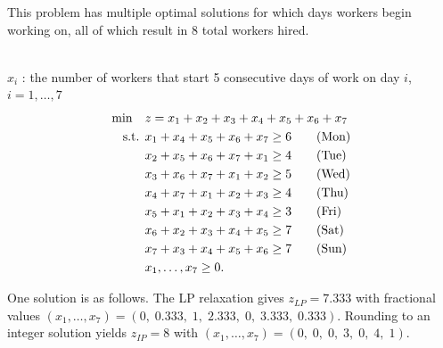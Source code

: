 \begin{solution} This problem has multiple optimal solutions for which days workers begin working on, all of which result in 8 total workers hired.

 \\
$x_i$ : the number of workers that start 5 consecutive days of work on day $i$, $ i = 1,\dots,7$ \\
\smallskip {}
\begin{align*}
\min \quad & z = x_1 + x_2 + x_3 + x_4 + x_5 + x_6 + x_7 \\
\mbox{ s.t. }        & x_1 + x_4 + x_5 + x_6 + x_7 \ge 6   \tag{Mon} \\
& x_2 + x_5 + x_6 + x_7 + x_1 \ge 4   \tag{Tue} \\
& x_3 + x_6 + x_7 + x_1 + x_2 \ge 5   \tag{Wed} \\
& x_4 + x_7 + x_1 + x_2 + x_3 \ge 4   \tag{Thu} \\
& x_5 + x_1 + x_2 + x_3 + x_4 \ge 3   \tag{Fri} \\
& x_6 + x_2 + x_3 + x_4 + x_5 \ge 7   \tag{Sat} \\
& x_7 + x_3 + x_4 + x_5 + x_6 \ge 7   \tag{Sun} \\
& x_1, \dots, x_7 \ge 0.
\end{align*}

One solution is as follows. The LP relaxation gives $z_{LP} = 7.333$ with fractional values $(x_1, \dots, x_7) = (0,\; 0.333,\; 1,\; 2.333,\; 0,\; 3.333,\; 0.333)$. Rounding to an integer solution yields $z_{IP} = 8$ with $(x_1, \dots, x_7) = (0,\; 0,\; 0,\; 3,\; 0,\; 4,\; 1)$.
\end{solution}

